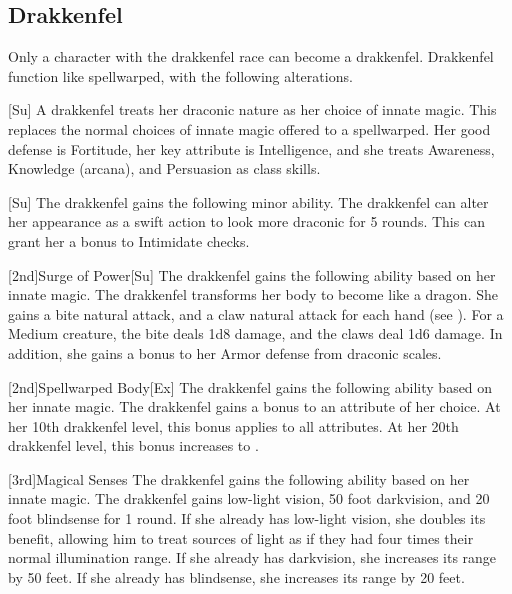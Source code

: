     \subsection{Drakkenfel}

        Only a character with the drakkenfel race can become a drakkenfel. Drakkenfel function like spellwarped, with the following alterations.

        [Su]
        A drakkenfel treats her draconic nature as her choice of innate magic.
        This replaces the normal choices of innate magic offered to a spellwarped.
        Her good defense is Fortitude, her key attribute is Intelligence, and she treats Awareness, Knowledge (arcana), and Persuasion as class skills.

        [Su]
        The drakkenfel gains the following minor ability.
        The drakkenfel can alter her appearance as a swift action to look more draconic for 5 rounds.
        This can grant her a  bonus to Intimidate checks.

        [2nd]{Surge of Power}[Su]
        The drakkenfel gains the following ability based on her innate magic.
        The drakkenfel transforms her body to become like a dragon.
        She gains a bite natural attack, and a claw natural attack for each hand (see ).
        For a Medium creature, the bite deals 1d8 damage, and the claws deal 1d6 damage.
        In addition, she gains a  bonus to her Armor defense from draconic scales.

        [2nd]{Spellwarped Body}[Ex]
        The drakkenfel gains the following ability based on her innate magic.
        The drakkenfel gains a  bonus to an attribute of her choice.
        At her 10th drakkenfel level, this bonus applies to all attributes.
        At her 20th drakkenfel level, this bonus increases to .

        [3rd]{Magical Senses}
        The drakkenfel gains the following ability based on her innate magic.
        The drakkenfel gains low-light vision, 50 foot darkvision, and 20 foot blindsense for 1 round.
        If she already has low-light vision, she doubles its benefit, allowing him to treat sources of light as if they had four times their normal illumination range.
        If she already has darkvision, she increases its range by 50 feet.
        If she already has blindsense, she increases its range by 20 feet.

